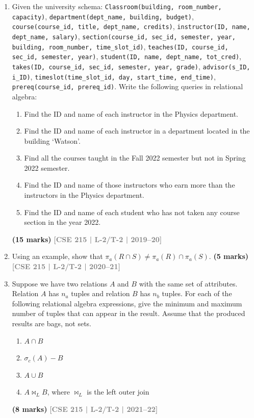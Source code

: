 \documentclass[12pt,a3paper]{article}
\newcommand{\yr}[1]{\hfill\textcolor{gray}{\small\textbf{[#1]}}}
\newcommand{\mk}[1]{\textcolor{orange!70!black}{\small\textbf{(#1 marks)}}}
\begin{document}
\begin{enumerate}
\item Given the university schema: \texttt{Classroom(building, room\_number, capacity)}, \texttt{department(dept\_name, building, budget)}, \texttt{course(course\_id, title, dept\_name, credits)}, \texttt{instructor(ID, name, dept\_name, salary)}, \texttt{section(course\_id, sec\_id, semester, year, building, room\_number, time\_slot\_id)}, \texttt{teaches(ID, course\_id, sec\_id, semester, year)}, \texttt{student(ID, name, dept\_name, tot\_cred)}, \texttt{takes(ID, course\_id, sec\_id, semester, year, grade)}, \texttt{advisor(s\_ID, i\_ID)}, \texttt{timeslot(time\_slot\_id, day, start\_time, end\_time)}, \texttt{prereq(course\_id, prereq\_id)}. Write the following queries in relational algebra:
\begin{enumerate}
  \item Find the ID and name of each instructor in the Physics department.
  \item Find the ID and name of each instructor in a department located in the building `Watson'.
  \item Find all the courses taught in the Fall 2022 semester but not in Spring 2022 semester.
  \item Find the ID and name of those instructors who earn more than the instructors in the Physics department.
  \item Find the ID and name of each student who has not taken any course section in the year 2022.
\end{enumerate}
\mk{15} \yr{CSE 215 | L-2/T-2 | 2019--20}

\item Using an example, show that $\pi_a(R \cap S) \neq \pi_a(R) \cap \pi_a(S)$.
\mk{5} \yr{CSE 215 | L-2/T-2 | 2020--21}

\item Suppose we have two relations $A$ and $B$ with the same set of attributes. Relation $A$ has $n_a$ tuples and relation $B$ has $n_b$ tuples. For each of the following relational algebra expressions, give the minimum and maximum number of tuples that can appear in the result. Assume that the produced results are bags, not sets.
\begin{enumerate}
  \item $A \cap B$
  \item $\sigma_c(A) - B$
  \item $A \cup B$
  \item $A \bowtie_L B$, where $\bowtie_L$ is the left outer join
\end{enumerate}
\mk{8} \yr{CSE 215 | L-2/T-2 | 2021--22}


\end{enumerate}
\end{document}

